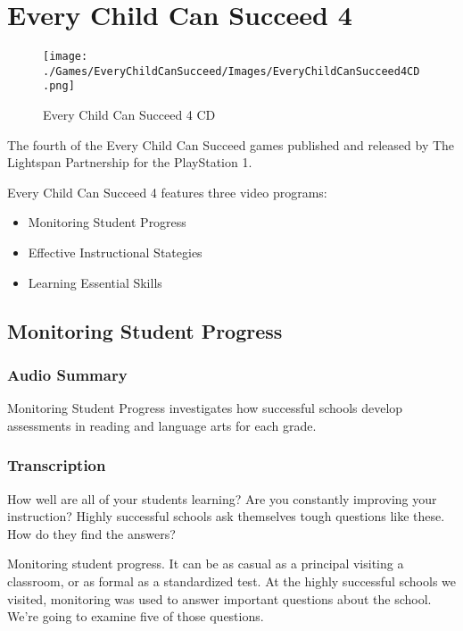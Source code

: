 \chapter{Every Child Can Succeed 4}

\begin{figure}[H]
    \centering
    \texttt{[image: ./Games/EveryChildCanSucceed/Images/EveryChildCanSucceed4CD.png]}
    \caption{Every Child Can Succeed 4 CD}
\end{figure}


The fourth of the Every Child Can Succeed games published and released by The Lightspan Partnership for the PlayStation 1.

Every Child Can Succeed 4 features three video programs:

\begin{itemize}
    \item Monitoring Student Progress
    \item Effective Instructional Stategies
    \item Learning Essential Skills
\end{itemize}

\clearpage
\newpage

\section{Monitoring Student Progress}

\subsection{Audio Summary}

Monitoring Student Progress investigates how successful schools develop assessments in reading and language arts for each grade.

\subsection{Transcription}

How well are all of your students learning? Are you constantly improving your instruction? Highly successful schools ask themselves tough questions like these. How do they find the answers?

Monitoring student progress. It can be as casual as a principal visiting a classroom, or as formal as a standardized test. At the highly successful schools we visited, monitoring was used to answer important questions about the school. We're going to examine five of those questions.

